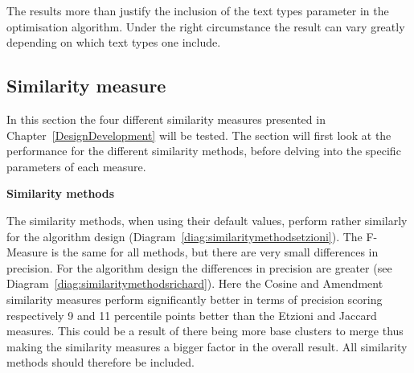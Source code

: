 The results more than justify the inclusion of the text types parameter in the optimisation algorithm. Under the right circumstance the result can vary greatly depending on which text types one include.

\subsection{Similarity measure}
In this section the four different similarity measures presented in Chapter~\ref{DesignDevelopment} will be tested. The section will first look at the performance for the different similarity methods, before delving into the specific parameters of each measure.

\textbf{Similarity methods}

The similarity methods, when using their default values, perform rather similarly for the \citeauthor{Oren1998} algorithm design (Diagram~\ref{diag:similaritymethodsetzioni}). The F-Measure is the same for all methods, but there are very small differences in precision. For the \citeauthor{Moe2013compact} algorithm design the differences in precision are greater (see Diagram~\ref{diag:similaritymethodsrichard}). Here the Cosine and Amendment similarity measures perform significantly better in terms of precision scoring respectively 9 and 11 percentile points better than the Etzioni and Jaccard measures. This could be a result of there being more base clusters to merge thus making the similarity measures a bigger factor in the overall result. All similarity methods should therefore be included.

